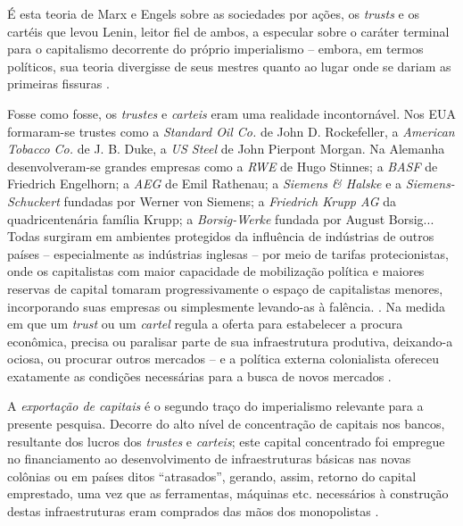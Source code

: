 É esta teoria de Marx e Engels sobre as sociedades por ações, os \textit{trusts} e os cartéis que levou Lenin, leitor fiel de ambos, a especular sobre o caráter terminal para o capitalismo decorrente do próprio imperialismo -- embora, em termos políticos, sua teoria divergisse de seus mestres quanto ao lugar onde se dariam as primeiras fissuras \cite{lenin_imperialismo_1987}.

Fosse como fosse, os \textit{trustes} e \textit{carteis} eram uma realidade incontornável. Nos EUA formaram-se trustes como a \textit{Standard Oil Co.} de John D. Rockefeller, a \textit{American Tobacco Co.} de J. B. Duke, a \textit{US Steel} de John Pierpont Morgan. Na Alemanha desenvolveram-se grandes empresas como a \textit{RWE} de Hugo Stinnes; a \textit{BASF} de Friedrich Engelhorn; a \textit{AEG} de Emil Rathenau; a \textit{Siemens \& Halske} e a \textit{Siemens-Schuckert} fundadas por Werner von Siemens; a \textit{Friedrich Krupp AG} da quadricentenária família Krupp; a \textit{Borsig-Werke} fundada por August Borsig...  Todas surgiram em ambientes protegidos da influência de indústrias de outros países -- especialmente as indústrias inglesas -- por meio de tarifas protecionistas, onde os capitalistas com maior capacidade de mobilização política e maiores reservas de capital tomaram progressivamente o espaço de capitalistas menores, incorporando suas empresas ou simplesmente levando-as à falência.  \cite{bukharin_imperialismo_1986,huberman_historia_1986}.  Na medida em que um \textit{trust} ou um \textit{cartel} regula a oferta para estabelecer a procura econômica, precisa ou paralisar parte de sua infraestrutura produtiva, deixando-a ociosa, ou procurar outros mercados -- e a política externa colonialista ofereceu exatamente as condições necessárias para a busca de novos mercados \cite{lenin_imperialismo_1987}. 

A \textit{exportação de capitais} é o segundo traço do imperialismo relevante para a presente pesquisa. Decorre do alto nível de concentração de capitais nos bancos, resultante dos lucros dos \textit{trustes} e \textit{carteis}; este capital concentrado foi empregue no financiamento ao desenvolvimento de infraestruturas básicas nas novas colônias ou em países ditos ``atrasados'', gerando, assim, retorno do capital emprestado, uma vez que as ferramentas, máquinas etc. necessários à construção destas infraestruturas eram comprados das mãos dos monopolistas \cite{huberman_historia_1986,lenin_imperialismo_1987,luxemburg_acumula_1985}. 

